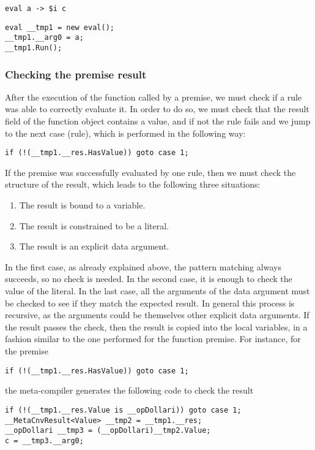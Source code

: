 \begin{lstlisting}
eval a -> $i c
\end{lstlisting}

\begin{lstlisting}
eval __tmp1 = new eval();
__tmp1.__arg0 = a;
__tmp1.Run();
\end{lstlisting}

\subsubsection{Checking the premise result}
After the execution of the function called by a premise, we must check if a rule was able to correctly evaluate it. In order to do so, we must check that the result field of the function object contains a value, and if not the rule fails and we jump to the next case (rule), which is performed in the following way:

\begin{lstlisting}
if (!(__tmp1.__res.HasValue)) goto case 1;
\end{lstlisting}

If the premise was successfully evaluated by one rule, then we must check the structure of the result, which leads to the following three situations:
\begin{enumerate}
	\item The result is bound to a variable.
	\item The result is constrained to be a literal.
	\item The result is an explicit data argument.
\end{enumerate}

In the first case, as already explained above, the pattern matching always succeeds, so no check is needed. In the second case, it is enough to check the value of the literal. In the last case, all the arguments of the data argument must be checked to see if they match the expected result. In general this process is recursive, as the arguments could be themselves other explicit data arguments. If the result passes the check, then the result is copied into the local variables, in a fashion similar to the one performed for the function premise. For instance, for the premise

\begin{lstlisting}
if (!(__tmp1.__res.HasValue)) goto case 1;
\end{lstlisting}

\noindent
the meta-compiler generates the following code to check the result
\begin{lstlisting}
if (!(__tmp1.__res.Value is __opDollari)) goto case 1;
__MetaCnvResult<Value> __tmp2 = __tmp1.__res;
__opDollari __tmp3 = (__opDollari)__tmp2.Value;
c = __tmp3.__arg0;
\end{lstlisting}

